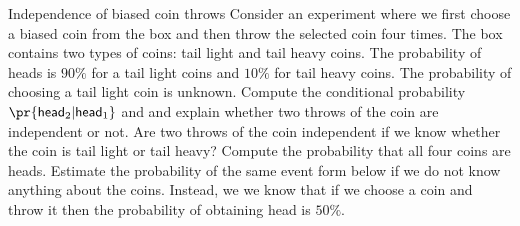 \documentclass{crypto-exercise}
\author{Sven Laur}
\newcommand{\HEAD}{\mathsf{head}}
\begin{document}
\begin{exercise}{Independence of biased coin throws}
Consider an experiment where we first choose a biased coin from the box and then throw the selected coin four times. The box contains two types of coins: tail light and tail heavy coins.  The probability of heads is $90\%$ for a tail light coins and $10\%$ for tail heavy coins. The probability of choosing a tail light coin is unknown. Compute the conditional probability $\pr{\HEAD_2|\HEAD_1}$ and and explain whether two throws of the coin are independent or not. Are two throws of the coin independent if we know whether the coin is tail light or tail heavy? Compute the probability that all four coins are heads. Estimate the probability of the same event form below if we do not know anything about the coins. Instead, we we know that if we choose a coin and throw it then the probability of obtaining head is $50\%$.
\end{exercise}
\end{document}
